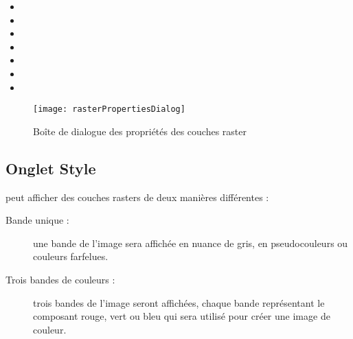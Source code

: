 \begin{itemize}[label=--]
 \item {}
 \item {}
 \item {}
 \item {}
 \item {}
 \item {}
 \item {}
\end{itemize}

\begin{figure}[htb]
  \begin{center}
   \texttt{[image: rasterPropertiesDialog]}
   \caption{Boîte de dialogue des propriétés des couches raster
\nixcaption}\label{fig:raster_properties}
\end{center}
\end{figure}

\subsection{Onglet Style}\label{label_sombology}

\qg peut afficher des couches rasters de deux manières différentes
:

\begin{description}
\item[Bande unique :] une bande de l'image sera affichée en nuance de gris, en pseudocouleurs ou 
couleurs farfelues.
\item[Trois bandes de couleurs :] trois bandes de l'image seront affichées,
chaque bande représentant le composant rouge, vert ou bleu qui sera utilisé pour créer une image de couleur.
\end{description}

